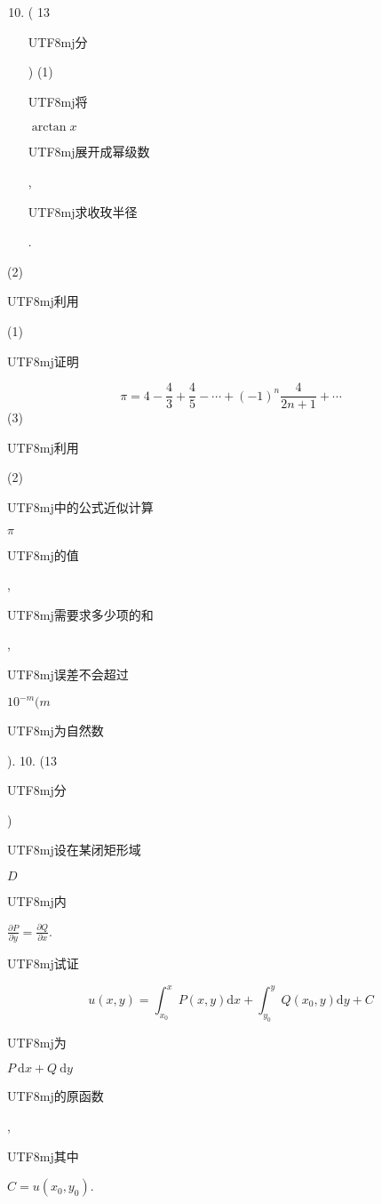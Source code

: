 \documentclass[10pt]{article}
\begin{document}
\begin{enumerate}
  \setcounter{enumi}{9}
  \item ( 13 \begin{CJK}{UTF8}{mj}分\end{CJK}) (1) \begin{CJK}{UTF8}{mj}将\end{CJK} $\arctan x$ \begin{CJK}{UTF8}{mj}展开成幂级数\end{CJK}, \begin{CJK}{UTF8}{mj}求收玫半径\end{CJK}.
\end{enumerate}
(2) \begin{CJK}{UTF8}{mj}利用\end{CJK} (1) \begin{CJK}{UTF8}{mj}证明\end{CJK}
$$
\pi=4-\frac{4}{3}+\frac{4}{5}-\cdots+(-1)^{n} \frac{4}{2 n+1}+\cdots
$$
(3) \begin{CJK}{UTF8}{mj}利用\end{CJK} (2) \begin{CJK}{UTF8}{mj}中的公式近似计算\end{CJK} $\pi$ \begin{CJK}{UTF8}{mj}的值\end{CJK}, \begin{CJK}{UTF8}{mj}需要求多少项的和\end{CJK}, \begin{CJK}{UTF8}{mj}误差不会超过\end{CJK} $10^{-m}(m$ \begin{CJK}{UTF8}{mj}为自然数\end{CJK}). 10. (13 \begin{CJK}{UTF8}{mj}分\end{CJK}) \begin{CJK}{UTF8}{mj}设在某闭矩形域\end{CJK} $D$ \begin{CJK}{UTF8}{mj}内\end{CJK} $\frac{\partial P}{\partial y}=\frac{\partial Q}{\partial x}$. \begin{CJK}{UTF8}{mj}试证\end{CJK}
$$
u(x, y)=\int_{x_{0}}^{x} P(x, y) \mathrm{d} x+\int_{y_{0}}^{y} Q\left(x_{0}, y\right) \mathrm{d} y+C
$$
\begin{CJK}{UTF8}{mj}为\end{CJK} $P \mathrm{~d} x+Q \mathrm{~d} y$ \begin{CJK}{UTF8}{mj}的原函数\end{CJK}, \begin{CJK}{UTF8}{mj}其中\end{CJK} $C=u\left(x_{0}, y_{0}\right)$.
\end{document}
